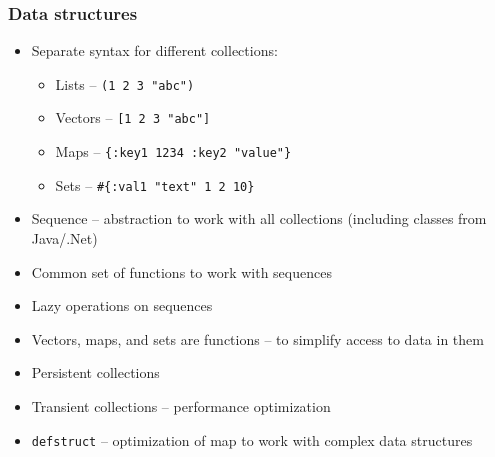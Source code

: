 \begin{frame}[t,fragile]
  \frametitle{Data structures}
  \begin{itemize}
  \item Separate syntax for different collections:
    \begin{itemize}
    \item Lists -- \texttt{(1 2 3 "abc")}
    \item Vectors -- \texttt{[1 2 3 "abc"]}
    \item Maps -- \lstinline!{:key1 1234 :key2 "value"}!
    \item Sets -- \lstinline!#{:val1 "text" 1 2 10}!
    \end{itemize}
  \item Sequence -- abstraction to work with all collections (including classes from
    Java/.Net)
  \item Common set of functions to work with sequences
  \item Lazy operations on sequences
  \item Vectors, maps, and sets are functions -- to simplify access to data in them
  \item Persistent collections
  \item Transient collections -- performance optimization
  \item \texttt{defstruct} -- optimization of map to work with complex data structures
  \end{itemize}
\end{frame}

